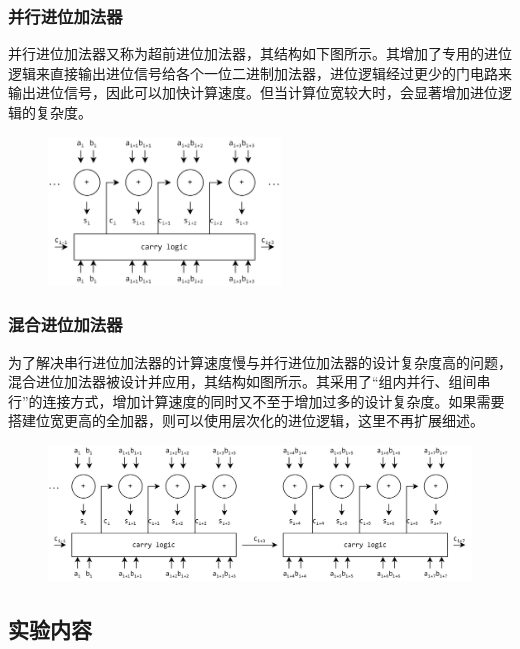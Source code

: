 \documentclass{ctexart}
\begin{document}
\subsubsection*{并行进位加法器}

并行进位加法器又称为超前进位加法器，其结构如下图所示。其增加了专用的进位逻辑来直接输出进位信号给各个一位二进制加法器，进位逻辑经过更少的门电路来输出进位信号，因此可以加快计算速度。但当计算位宽较大时，会显著增加进位逻辑的复杂度。

\begin{figure}[H]
    \centering
    \includegraphics[width=0.55\textwidth]{lab1/5.jpg}
\end{figure}

\subsubsection*{混合进位加法器}

为了解决串行进位加法器的计算速度慢与并行进位加法器的设计复杂度高的问题，混合进位加法器被设计并应用，其结构如图所示。其采用了“组内并行、组间串行”的连接方式，增加计算速度的同时又不至于增加过多的设计复杂度。如果需要搭建位宽更高的全加器，则可以使用层次化的进位逻辑，这里不再扩展细述。

\begin{figure}[H]
    \centering
    \includegraphics[width=\textwidth]{lab1/6.jpg}
\end{figure}

\subsection{实验内容}
\end{document}
